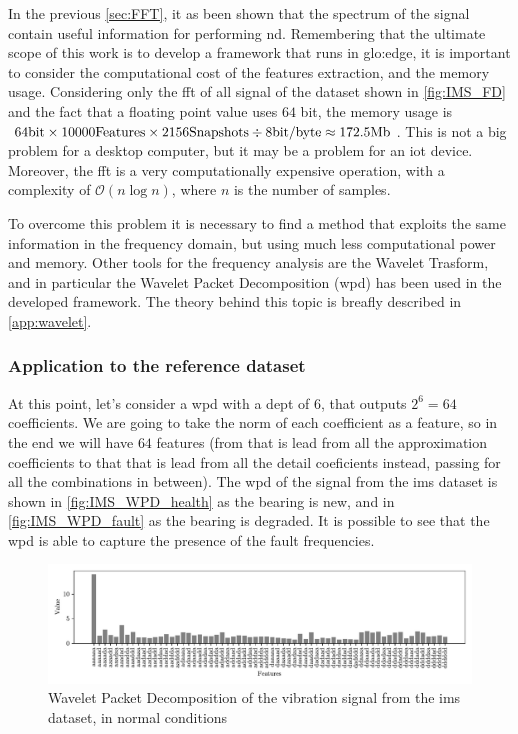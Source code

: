 In the previous \autoref{sec:FFT}, it as been shown that the spectrum of the signal contain useful information for performing \gls{nd}. Remembering that the ultimate scope of this work is to develop a framework that runs in \gls{glo:edge}, it is important to consider the computational cost of the features extraction, and the memory usage. Considering only the \gls{fft} of all signal of the dataset shown in \autoref{fig:IMS_FD} and the fact that a floating point value uses $64$ bit, the memory usage is $64 \si{\bit} \times 10000 \text{Features} \times 2156 \text{Snapshots} \div 8 \text{bit/byte} \approx 172.5 \text{Mb}$. This is not a big problem for a desktop computer, but it may be a problem for an \gls{iot} device. Moreover, the \gls{fft} is a very computationally expensive operation, with a complexity of $\mathcal{O}(n \log n)$, where $n$ is the number of samples.

To overcome this problem it is necessary to find a method that exploits the same information in the frequency domain, but using much less computational power and memory. Other tools for the frequency analysis are the Wavelet Trasform, and in particular the Wavelet Packet Decomposition (\gls{wpd}) has been used in the developed framework. The theory behind this topic is breafly described in \autoref{app:wavelet}.

\subsubsection{Application to the reference dataset}

At this point, let's consider a \gls{wpd} with a dept of $6$, that outputs $2^6=64$ coefficients. We are going to take the norm of each coefficient as a feature, so in the end we will have $64$ features (from  that is lead from all the approximation coefficients to  that that is lead from all the detail coeficients instead, passing for all the combinations in between). The \gls{wpd} of the  signal from the \gls{ims} dataset is shown in \autoref{fig:IMS_WPD_health} as the bearing is new, and in \autoref{fig:IMS_WPD_fault} as the bearing is degraded. It is possible to see that the \gls{wpd} is able to capture the presence of the fault frequencies.

\begin{figure}[hbtp]
    \centering
    \includegraphics[width=\textwidth]{images/FeatureExtraction/IMS_WPD_health.pdf}
    \caption{Wavelet Packet Decomposition of the  vibration signal from the \gls{ims} dataset, in normal conditions}
    \label{fig:IMS_WPD_health}
\end{figure}

